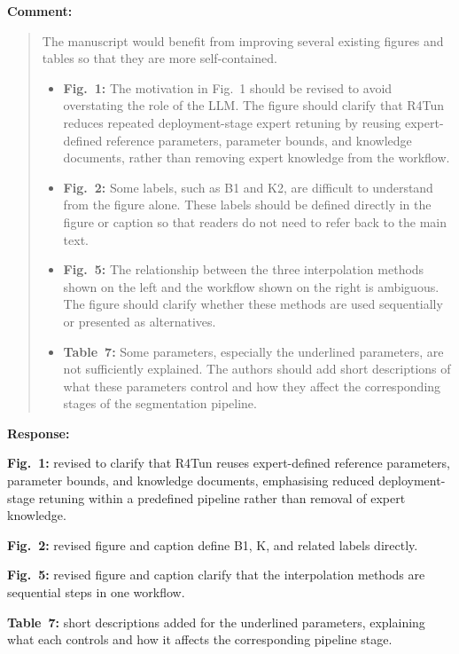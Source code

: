 \documentclass[11pt,a4paper]{article}
\newenvironment{commentblock}{%
  \par\smallskip\noindent\textbf{Comment:}\par
  \begin{quote}\itshape\color{black}
}{%
  \end{quote}\smallskip
}
\newenvironment{responseblock}{%
  \par\smallskip\noindent\textbf{Response:}\par
  \begingroup\color{responsegreen}
}{%
  \endgroup\smallskip
}
\begin{document}
\begin{commentblock}
The manuscript would benefit from improving several existing figures and tables so that they are more self-contained.
\begin{itemize}[nosep]
  \item \textbf{Fig.~1:} The motivation in Fig.~1 should be revised to avoid overstating the role of the LLM. The figure should clarify that R4Tun reduces repeated deployment-stage expert retuning by reusing expert-defined reference parameters, parameter bounds, and knowledge documents, rather than removing expert knowledge from the workflow.
  \item \textbf{Fig.~2:} Some labels, such as B1 and K2, are difficult to understand from the figure alone. These labels should be defined directly in the figure or caption so that readers do not need to refer back to the main text.
  \item \textbf{Fig.~5:} The relationship between the three interpolation methods shown on the left and the workflow shown on the right is ambiguous. The figure should clarify whether these methods are used sequentially or presented as alternatives.
  \item \textbf{Table~7:} Some parameters, especially the underlined parameters, are not sufficiently explained. The authors should add short descriptions of what these parameters control and how they affect the corresponding stages of the segmentation pipeline.
\end{itemize}
\end{commentblock}
\begin{responseblock}
\textbf{Fig.~1:} revised to clarify that R4Tun reuses expert-defined reference parameters, parameter bounds, and knowledge documents, emphasising reduced deployment-stage retuning within a predefined pipeline rather than removal of expert knowledge.

\textbf{Fig.~2:} revised figure and caption define B1, K, and related labels directly.

\textbf{Fig.~5:} revised figure and caption clarify that the interpolation methods are sequential steps in one workflow.

\textbf{Table~7:} short descriptions added for the underlined parameters, explaining what each controls and how it affects the corresponding pipeline stage.
\end{responseblock}
\end{document}
